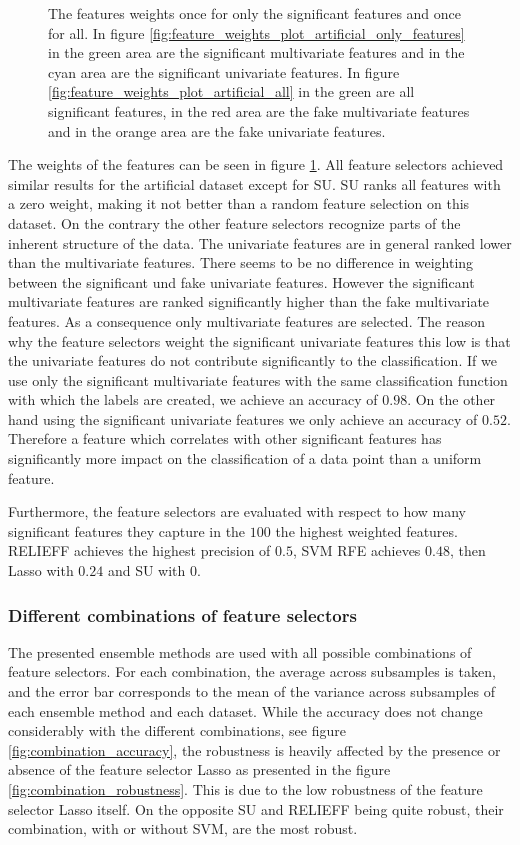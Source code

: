 \documentclass[twoside,11pt]{article}
\begin{document}
\begin{figure}
  \caption{The features weights  once for only the significant features and once for all. In figure \ref{fig:feature_weights_plot_artificial_only_features} in the green area are the significant multivariate features and in the cyan area are the significant univariate features. In figure \ref{fig:feature_weights_plot_artificial_all} in the green are all significant features, in the red area are the fake multivariate features and in the orange area are the fake univariate features. }
  \label{fig:feature_weights_plot_artificial}
\end{figure}
The weights of the features can be seen in figure \ref{fig:feature_weights_plot_artificial}.
All feature selectors achieved similar results for the artificial dataset except for SU. SU ranks all features with a zero weight, making it not better than a random feature selection on this dataset. On the contrary the other feature selectors recognize parts of the inherent structure of the data. The univariate features are in general ranked lower than the multivariate features. There seems to be no difference in weighting between the significant und fake univariate features. However the significant multivariate features are ranked significantly higher than the fake multivariate features. As a consequence only multivariate features are selected. The reason why the feature selectors weight the significant univariate features this low is that the univariate features do not contribute significantly to the classification. If we use only the significant multivariate features with the same classification function with which the labels are created, we achieve an accuracy of $0.98$. On the other hand using the significant univariate features we only achieve an accuracy of $0.52$. Therefore a feature which correlates with other significant features has significantly more impact on the classification of a data point than a uniform feature.

Furthermore, the feature selectors are evaluated with respect to how many significant features they capture in the $100$ the highest weighted features. RELIEFF achieves the highest precision of $0.5$, SVM RFE achieves $0.48$, then Lasso with $0.24$ and SU with $0$.

\subsubsection{Different combinations of feature selectors}
The presented ensemble methods are used with all possible combinations of feature selectors. For each combination, the average across subsamples  is taken, and the error bar corresponds to the mean of the variance across subsamples of each ensemble method and each dataset. While the accuracy does not change considerably with the different combinations, see figure \ref{fig:combination_accuracy}, the robustness is heavily affected by the presence or absence of the feature selector Lasso as presented in the figure \ref{fig:combination_robustness}. This is due to the low robustness of the feature selector Lasso itself. On the opposite SU and RELIEFF being quite robust, their combination, with or without SVM, are the most robust.  
\end{document}
